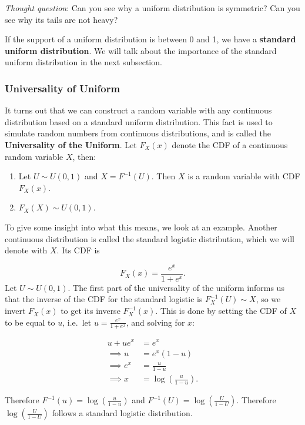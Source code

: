 \documentclass[
]{book}
\providecommand{\tightlist}{%
  \setlength{\itemsep}{0pt}\setlength{\parskip}{0pt}}
\begin{document}
\emph{Thought question}: Can you see why a uniform distribution is symmetric? Can you see why its tails are not heavy?

If the support of a uniform distribution is between 0 and 1, we have a \textbf{standard uniform distribution}. We will talk about the importance of the standard uniform distribution in the next subsection.

\hypertarget{universality-of-uniform}{%
\subsubsection{Universality of Uniform}\label{universality-of-uniform}}

It turns out that we can construct a random variable with any continuous distribution based on a standard uniform distribution. This fact is used to simulate random numbers from continuous distributions, and is called the \textbf{Universality of the Uniform}. Let \(F_X(x)\) denote the CDF of a continuous random variable \(X\), then:

\begin{enumerate}
\def\labelenumi{\arabic{enumi}.}
\tightlist
\item
  Let \(U \sim U(0,1)\) and \(X = F^{-1}(U)\). Then \(X\) is a random variable with CDF \(F_X(x)\).
\item
  \(F_X(X) \sim U(0,1)\).
\end{enumerate}

To give some insight into what this means, we look at an example. Another continuous distribution is called the standard logistic distribution, which we will denote with \(X\). Its CDF is

\[
F_X(x) = \frac{e^x}{1+e^x}.
\]
Let \(U \sim U(0,1)\). The first part of the universality of the uniform informs us that the inverse of the CDF for the standard logistic is \(F_X^{-1}(U) \sim X\), so we invert \(F_X(x)\) to get its inverse \(F_X^{-1}(x)\). This is done by setting the CDF of \(X\) to be equal to \(u\), i.e.~let \(u = \frac{e^x}{1+e^x}\), and solving for \(x\):

\[
\begin{split}
u + u e^x &= e^x\\
\implies u &= e^x (1-u) \\
\implies e^x &= \frac{u}{1-u} \\
\implies x &= \log (\frac{u}{1-u}).
\end{split}
\]

Therefore \(F^{-1}(u) = \log (\frac{u}{1-u})\) and \(F^{-1}(U) = \log (\frac{U}{1-U})\). Therefore \(\log (\frac{U}{1-U})\) follows a standard logistic distribution.
\end{document}
